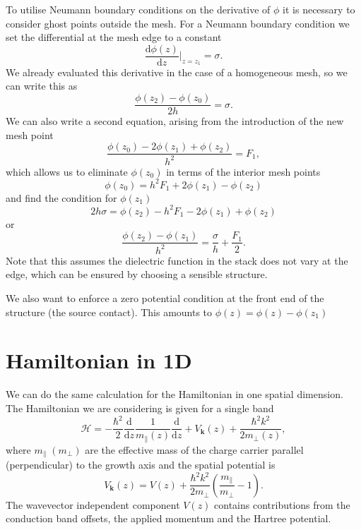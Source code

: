 \documentclass[reprint, amsmath,amssymb, aps]{revtex4-1}
\begin{document}
To utilise Neumann boundary conditions on the derivative of $\phi$ it is necessary to consider ghost points outside the mesh. For a Neumann boundary condition we set the differential at the mesh edge to a constant
\begin{equation}
	\frac{\mathrm{d} \phi \left(z\right)}{\mathrm{d} z} \biggr\vert_{z = z_1} = \sigma.
\end{equation}
We already evaluated this derivative in the case of a homogeneous mesh, so we can write this as
\begin{equation}
	\frac{\phi\left(z_{2}\right) - \phi\left(z_{0}\right)}{2 h} = \sigma.
\end{equation}
We can also write a second equation, arising from the introduction of the new mesh point
\begin{equation}
	\frac{\phi\left(z_0\right) - 2 \phi \left(z_1\right) + \phi \left(z_2\right)}{h^2} = F_1,
\end{equation}
which allows us to eliminate $\phi\left(z_0\right)$ in terms of the interior mesh points
\begin{equation}
	\phi\left(z_0\right) = h^2 F_1 + 2 \phi\left(z_1\right) - \phi\left(z_2\right)
\end{equation}
and find the condition for $\phi\left(z_1\right)$
\begin{equation}
	2 h \sigma = \phi\left(z_2\right) - h^2 F_1 - 2 \phi\left(z_1\right) + \phi\left(z_2\right)
\end{equation}
or
\begin{equation}
	\frac{\phi\left(z_2\right) - \phi\left(z_1\right)}{h^2} = \frac{\sigma}{h} + \frac{F_1}{2}.
\end{equation}
Note that this assumes the dielectric function in the stack does not vary at the edge, which can be ensured by choosing a sensible structure.

We also want to enforce a zero potential condition at the front end of the structure (the source contact). This amounts to $\phi(z) = \phi(z) - \phi\left(z_1\right)$

\section{Hamiltonian in 1D}
We can do the same calculation for the Hamiltonian in one spatial dimension. The Hamiltonian we are considering is given for a single band
\begin{equation}
	\hat{\mathcal{H}} = - \frac{\hbar^2}{2} \frac{\mathrm{d}}{\mathrm{d} z} \frac{1}{m_{\parallel} \left(z\right)} \frac{\mathrm{d}}{\mathrm{d} z} + V_{\mathbf{k}} \left(z\right)+ \frac{\hbar^2 k^2}{2 m_{\perp}\left(z\right)},
\end{equation}
where $m_{\parallel} \; (m_{\perp})$ are the effective mass of the charge carrier parallel (perpendicular) to the growth axis and the spatial potential is
\begin{equation}
	V_{\mathbf{k}} \left(z\right) = V\left(z\right) + \frac{\hbar^2 k^2}{2 m_{\perp}} \left(\frac{m_{\parallel}}{m_{\perp}} - 1\right).
\end{equation}
The wavevector independent component $V\left(z\right)$ contains contributions from the conduction band offsets, the applied momentum and the Hartree potential.
\end{document}
